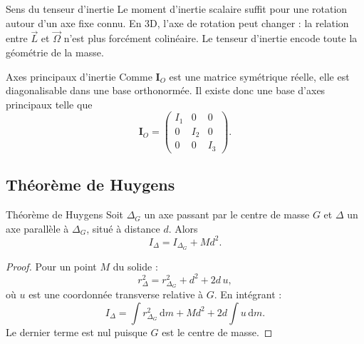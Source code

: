 \documentclass[11pt,a4paper]{article}
\newcommand{\dd}{\,\mathrm{d}}
\newcommand{\mat}[1]{\mathbf{#1}}
\begin{document}
\begin{intuitionbox}{Sens du tenseur d'inertie}{}
Le moment d'inertie scalaire suffit pour une rotation autour d'un axe fixe connu.
En 3D, l'axe de rotation peut changer : la relation entre $\vec L$ et $\vec\Omega$ n'est plus forcément colinéaire.
Le tenseur d'inertie encode toute la géométrie de la masse.
\end{intuitionbox}

\begin{theoremBox}{Axes principaux d'inertie}{}
Comme $\mat I_O$ est une matrice symétrique réelle, elle est diagonalisable dans une base orthonormée.
Il existe donc une base d'axes principaux telle que
\[
\mat I_O=
\begin{pmatrix}
I_1&0&0\\
0&I_2&0\\
0&0&I_3
\end{pmatrix}.
\]
\end{theoremBox}

\subsection{Théorème de Huygens}

\begin{theoremBox}{Théorème de Huygens}{}
Soit $\Delta_G$ un axe passant par le centre de masse $G$ et $\Delta$ un axe parallèle à $\Delta_G$, situé à distance $d$.
Alors
\[
I_\Delta=I_{\Delta_G}+Md^2.
\]
\end{theoremBox}

\begin{proof}
Pour un point $M$ du solide :
\[
r_\Delta^2=r_{\Delta_G}^2+d^2+2d\,u,
\]
où $u$ est une coordonnée transverse relative à $G$.
En intégrant :
\[
I_\Delta=\int r_{\Delta_G}^2\dd m+Md^2+2d\int u\dd m.
\]
Le dernier terme est nul puisque $G$ est le centre de masse.
\end{proof}

\begin{center}
\end{center}
\end{document}

